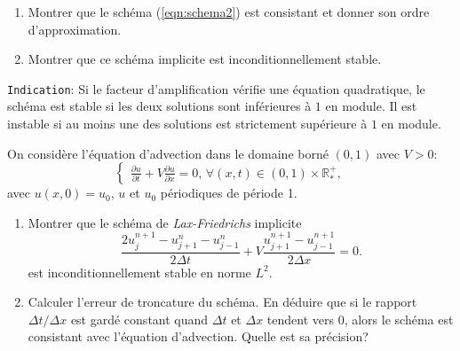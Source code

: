 \documentclass[12pt,a4paper]{article}
\begin{document}
\begin{enumerate}
\item Montrer que le schéma (\ref{eqn:schema2}) est consistant et donner son ordre d'approximation.
\item Montrer que ce sch\'ema implicite est inconditionnellement stable. 
\end{enumerate}
\texttt{Indication}: Si le facteur d'amplification vérifie une équation quadratique, le schéma est stable si les deux solutions sont inférieures à $1$ en module. Il est instable si au moins une des solutions est strictement supérieure à $1$ en module.\\


\noindent On considère l'\'equation d'advection dans le domaine born\'e $(0,1)$ avec $V>0$:
$$
\begin{cases}
\displaystyle\frac{\partial u}{\partial t}+V\frac{\partial u}{\partial
  x}=0,\, \forall (x,t)\in(0,1)\times\mathbb{R}^+_*,
\end{cases}
$$
avec $u(x, 0) = u_0$, $u$ et $u_0$ p\'eriodiques de p\'eriode 1. \\

\begin{enumerate}
\item Montrer que le sch\'ema de {\it Lax-Friedrichs} implicite
$$
\frac{2u_j^{n+1}-u_{j+1}^{n}-u_{j-1}^{n}}{2\Delta t}+V \frac{u_{j+1}^{n+1}-u_{j-1}^{n+1}}{2\Delta x}=0.
$$
est inconditionnellement stable en norme $L^2$. \\

\item Calculer l'erreur de troncature du sch\'ema.
En d\'eduire que si le rapport $\Delta t/\Delta x$ est gard\'e
constant quand $\Delta t$ et $\Delta x$ tendent vers $0$, alors le
sch\'ema est consistant avec l'\'equation d'advection. Quelle est sa précision? 

%
%
\end{enumerate}
\end{document}
